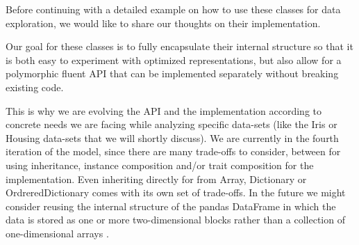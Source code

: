 \documentclass[sigplan]{acmart}
\begin{document}
Before continuing with a detailed example on how to use these classes 
for data exploration, we would like to share our thoughts on their implementation. 

Our goal for these classes is to fully encapsulate their internal structure so that it is both easy to experiment with optimized  representations, but also allow for a polymorphic fluent API that can be implemented separately without breaking existing code. 

This is why we are evolving the API and the implementation according to concrete needs we are facing while analyzing specific data-sets (like the Iris or Housing data-sets that we will shortly discuss). We are currently in the fourth iteration of the model, since there are many trade-offs to consider, between for \eg using inheritance, instance composition and/or trait composition for the implementation. Even inheriting directly for \eg from Array, Dictionary or OrdreredDictionary comes with its own set of trade-offs. In the future we might consider reusing the internal structure of the pandas DataFrame in which the data is stored as one or more two-dimensional blocks rather than a collection of one-dimensional arrays \cite{McKinney}. 
\end{document}
